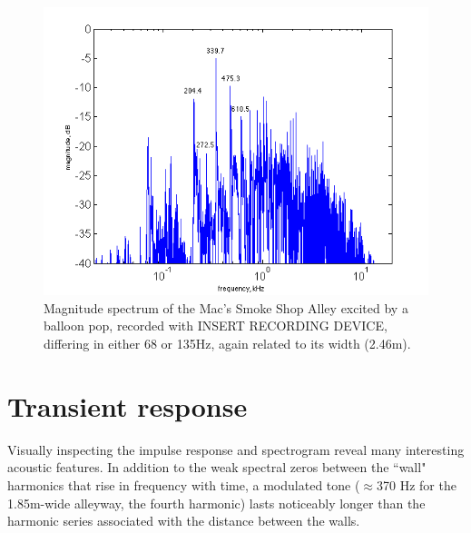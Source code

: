 \documentclass{aes137}
\begin{document}
\begin{figure}[h!] \centering \includegraphics[width=\linewidth]{images/macs_labeled_IR.png} 
\caption{Magnitude spectrum of the Mac's Smoke Shop Alley excited by a
  balloon pop, recorded with INSERT RECORDING DEVICE, differing in
  either 68 or 135Hz, again related to its width (2.46m).}
\end{figure}



\section{Transient response}
Visually inspecting the impulse response and spectrogram reveal many interesting acoustic features. In addition to the weak spectral zeros between the ``wall" harmonics that rise in frequency with time, a modulated tone ($\approx$370 Hz for the 1.85m-wide alleyway, the fourth harmonic) lasts
noticeably longer than the harmonic series associated with the distance between the walls.
\end{document}
